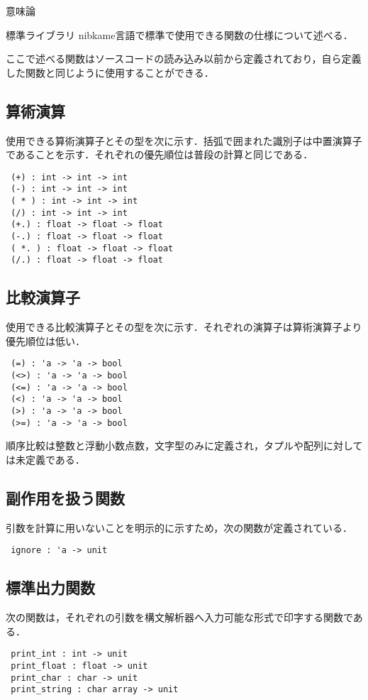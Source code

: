 \documentclass[a4paper,titlepage,report]{jsbook}
\begin{document}
\begin{resbonsiblesection}{意味論}{\sakamoto}
\end{resbonsiblesection}

\begin{resbonsiblesection}{標準ライブラリ}{\kobori}
nibkame言語で標準で使用できる関数の仕様について述べる．

ここで述べる関数はソースコードの読み込み以前から定義されており，自ら定義
した関数と同じように使用することができる．

\subsection{算術演算}
使用できる算術演算子とその型を次に示す．括弧で囲まれた識別子は中置演算子
であることを示す．それぞれの優先順位は普段の計算と同じである．
\begin{lstlisting}
 (+) : int -> int -> int
 (-) : int -> int -> int
 ( * ) : int -> int -> int
 (/) : int -> int -> int
 (+.) : float -> float -> float
 (-.) : float -> float -> float
 ( *. ) : float -> float -> float
 (/.) : float -> float -> float
\end{lstlisting}

\subsection{比較演算子}
使用できる比較演算子とその型を次に示す．それぞれの演算子は算術演算子より
優先順位は低い．
\begin{lstlisting}
 (=) : 'a -> 'a -> bool
 (<>) : 'a -> 'a -> bool
 (<=) : 'a -> 'a -> bool
 (<) : 'a -> 'a -> bool
 (>) : 'a -> 'a -> bool
 (>=) : 'a -> 'a -> bool
\end{lstlisting}
順序比較は整数と浮動小数点数，文字型のみに定義され，タプルや配列に対して
は未定義である．

\subsection{副作用を扱う関数}
引数を計算に用いないことを明示的に示すため，次の関数が定義されている．
\begin{lstlisting}
 ignore : 'a -> unit
\end{lstlisting}

\subsection{標準出力関数}
次の関数は，それぞれの引数を構文解析器へ入力可能な形式で印字する関数であ
る．
\begin{lstlisting}
 print_int : int -> unit
 print_float : float -> unit
 print_char : char -> unit
 print_string : char array -> unit
\end{lstlisting}


\end{resbonsiblesection}
\end{document}
